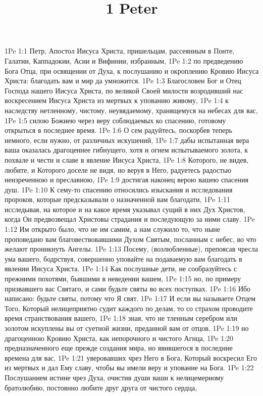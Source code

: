 

\title{1 Peter}

1Pe 1:1  Петр, Апостол Иисуса Христа, пришельцам, рассеянным в Понте, Галатии, Каппадокии, Асии и Вифинии, избранным,
1Pe 1:2  по предведению Бога Отца, при освящении от Духа, к послушанию и окроплению Кровию Иисуса Христа: благодать вам и мир да умножится.
1Pe 1:3  Благословен Бог и Отец Господа нашего Иисуса Христа, по великой Своей милости возродивший нас воскресением Иисуса Христа из мертвых к упованию живому,
1Pe 1:4  к наследству нетленному, чистому, неувядаемому, хранящемуся на небесах для вас,
1Pe 1:5  силою Божиею через веру соблюдаемых ко спасению, готовому открыться в последнее время.
1Pe 1:6  О сем радуйтесь, поскорбев теперь немного, если нужно, от различных искушений,
1Pe 1:7  дабы испытанная вера ваша оказалась драгоценнее гибнущего, хотя и огнем испытываемого золота, к похвале и чести и славе в явление Иисуса Христа,
1Pe 1:8  Которого, не видев, любите, и Которого доселе не видя, но веруя в Него, радуетесь радостью неизреченною и преславною,
1Pe 1:9  достигая наконец верою вашею спасения душ.
1Pe 1:10  К сему-то спасению относились изыскания и исследования пророков, которые предсказывали о назначенной вам благодати,
1Pe 1:11  исследывая, на которое и на какое время указывал сущий в них Дух Христов, когда Он предвозвещал Христовы страдания и последующую за ними славу.
1Pe 1:12  Им открыто было, что не им самим, а нам служило то, что ныне проповедано вам благовествовавшими Духом Святым, посланным с небес, во что желают проникнуть Ангелы.
1Pe 1:13  Посему, (возлюбленные), препоясав чресла ума вашего, бодрствуя, совершенно уповайте на подаваемую вам благодать в явлении Иисуса Христа.
1Pe 1:14  Как послушные дети, не сообразуйтесь с прежними похотями, бывшими в неведении вашем,
1Pe 1:15  но, по примеру призвавшего вас Святаго, и сами будьте святы во всех поступках.
1Pe 1:16  Ибо написано: будьте святы, потому что Я свят.
1Pe 1:17  И если вы называете Отцем Того, Который нелицеприятно судит каждого по делам, то со страхом проводите время странствования вашего,
1Pe 1:18  зная, что не тленным серебром или золотом искуплены вы от суетной жизни, преданной вам от отцов,
1Pe 1:19  но драгоценною Кровию Христа, как непорочного и чистого Агнца,
1Pe 1:20  предназначенного еще прежде создания мира, но явившегося в последние времена для вас,
1Pe 1:21  уверовавших чрез Него в Бога, Который воскресил Его из мертвых и дал Ему славу, чтобы вы имели веру и упование на Бога.
1Pe 1:22  Послушанием истине чрез Духа, очистив души ваши к нелицемерному братолюбию, постоянно любите друг друга от чистого сердца,

